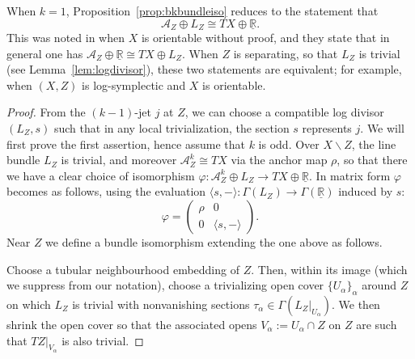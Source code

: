 \documentclass[pdftex]{sigma}
\numberwithin{equation}{section}
\begin{document}
\begin{Remark}\label{rem:slightinaccuracy} When $k = 1$, Proposition~\ref{prop:bkbundleiso} reduces to the statement that
\begin{displaymath}
	\mathcal{A}_Z \oplus L_Z \cong TX \oplus \underline{\mathbb{R}}.
\end{displaymath}
This was noted in \cite{CannasDaSilva10, CannasDaSilvaGuilleminWoodward00} when $X$ is orientable without proof, and they state that in general one has $\mathcal{A}_Z \oplus \underline{\mathbb{R}} \cong TX \oplus L_Z$. When $Z$ is separating, so that $L_Z$ is trivial (see Lemma~\ref{lem:logdivisor}), these two statements are equivalent; for example, when $(X,Z)$ is log-symplectic and $X$ is orientable.
\end{Remark}

\begin{proof} From the $(k-1)$-jet $j$ at $Z$, we can choose a compatible log divisor $(L_Z,s)$ such that in any local trivialization, the section $s$ represents $j$. We will first prove the first assertion, hence assume that $k$ is odd. Over $X \backslash Z$, the line bundle $L_Z$ is trivial, and moreover $\mathcal{A}_Z^k \cong TX$ via the anchor map $\rho$, so that there we have a clear choice of isomorphism $\varphi\colon \mathcal{A}_Z^k \oplus L_Z \to TX \oplus \underline{\mathbb{R}}$. In matrix form $\varphi$ becomes as follows, using the evaluation $\langle s , - \rangle\colon \Gamma(L_Z) \to \Gamma(\underline{\mathbb{R}})$ induced by $s$:
\begin{displaymath}
 	\varphi = \begin{pmatrix} \rho & 0 \\ 0 & \langle s , - \rangle \end{pmatrix}.
\end{displaymath}
Near $Z$ we define a bundle isomorphism extending the one above as follows.

Choose a tubular neighbourhood embedding of $Z$. Then, within its image (which we suppress from our notation), choose a trivializing open cover $\{U_\alpha\}_\alpha$ around $Z$ on which $L_Z$ is trivial with nonvanishing sections $\tau_\alpha \in \Gamma(L_Z|_{U_\alpha})$. We then shrink the open cover so that the associated opens $V_\alpha := U_\alpha \cap Z$ on $Z$ are such that $TZ|_{V_\alpha}$ is also trivial.


\end{proof}
\end{document}
